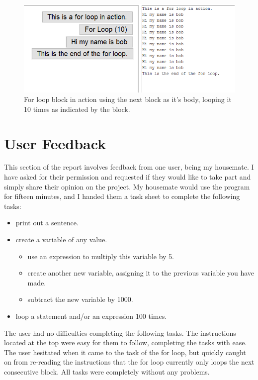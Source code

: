 \documentclass[a4paper, 12pt]{article}
\begin{document}
            \begin{figure}[h]
                \centering
                \includegraphics[width=130mm]{for_loop.png}
                \caption{For loop block in action using the next block as it's body, looping
                it 10 times as indicated by the block.}
            \end{figure}
        
    \clearpage
    \section{User Feedback}
        This section of the report involves feedback from one user, being my housemate. I have asked for
        their permission and requested if they would like to take part and simply share their opinion on
        the project. My housemate would use the program for fifteen minutes, and I handed them a task sheet
        to complete the following tasks:

        \begin{itemize}
            \item print out a sentence.
            \item create a variable of any value.
            \begin{itemize}
                \item use an expression to multiply this variable by 5.
                \item create another new variable, assigning it to the previous variable you have made.
                \item subtract the new variable by 1000.
            \end{itemize}
            \item loop a statement and/or an expression 100 times.
        \end{itemize}

        The user had no difficulties completing the following tasks. The instructions located at the top were
        easy for them to follow, completing the tasks with ease. The user hesitated when it came to the task
        of the for loop, but quickly caught on from re-reading the instructions that the for loop currently
        only loops the next consecutive block. All tasks were completely without any problems. \\
\end{document}
